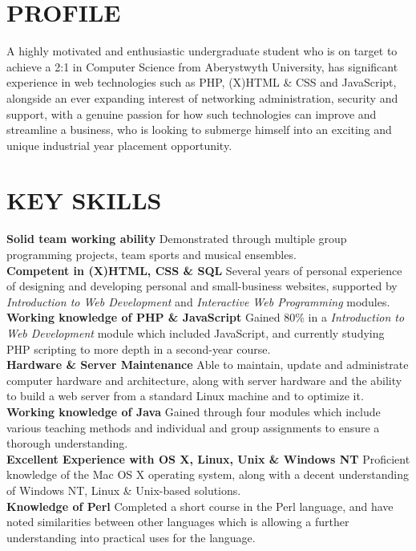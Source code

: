\documentclass[line,margin]{res}
\begin{document}
\address{219 Grindley Lane, Blythe Bridge, Stoke-on-Trent, ST11 9JS}
\address{+44 (0) 78927 18071\\mail@edparry.com\\edparry.com}

 
\begin{resume}
 
\section{PROFILE}A highly motivated and enthusiastic undergraduate student who is on target to achieve a 2:1 in Computer Science from Aberystwyth University, has significant experience in web technologies such as PHP, (X)HTML \& CSS and JavaScript, alongside an ever expanding interest of networking administration, security and support, with a genuine passion for how such technologies can improve and streamline a business, who is looking to submerge himself into an exciting and unique industrial year placement opportunity.
 

\section{KEY SKILLS}
{\bf Solid team working ability} Demonstrated through multiple group programming projects, team sports and musical ensembles.\\
{\bf Competent in (X)HTML, CSS \& SQL} Several years of personal experience of designing and developing personal and small-business websites, supported by {\sl Introduction to Web Development} and {\sl Interactive Web Programming} modules.\\
{\bf Working knowledge of PHP \& JavaScript} Gained 80\% in a {\sl Introduction to Web Development} module which included JavaScript, and currently studying PHP scripting to more depth in a second-year course.\\
{\bf Hardware \& Server Maintenance} Able to maintain, update and administrate computer hardware and architecture, along with server hardware and the ability to build a web server from a standard Linux machine and to optimize it.\\
{\bf Working knowledge of Java} Gained through four modules which include various teaching methods and individual and group assignments to ensure a thorough understanding.\\
{\bf Excellent Experience with OS X, Linux, Unix \& Windows NT} Proficient knowledge of the Mac OS X operating system, along with a decent understanding of Windows NT, Linux \& Unix-based solutions.\\
{\bf Knowledge of Perl} Completed a short course in the Perl language, and have noted similarities between other languages which is allowing a further understanding into practical uses for the language.
 

\end{resume}
\end{document}
